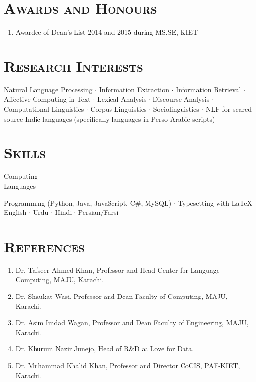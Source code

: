 \documentclass[a4paper, 10pt]{article}
\begin{document}
\section*{\normalfont\textsc{Awards and Honours}}
\begin{enumerate}
\itemsep-4pt 
 \item Awardee of Dean's List 2014 and 2015 during MS.SE, KIET
\end{enumerate}

\section*{\normalfont\textsc{Research Interests}}
Natural Language Processing $\cdot$ Information Extraction $\cdot$ Information Retrieval $\cdot$ Affective Computing in Text $\cdot$ Lexical Analysis $\cdot$ Discourse Analysis $\cdot$ Computational Linguistics $\cdot$  Corpus Linguistics $\cdot$ Sociolinguistics $\cdot$ NLP for scared source Indic languages (specifically languages in Perso-Arabic scripts)

\section*{\normalfont\textsc{Skills}}
\hfill\begin{minipage}{0.17\textwidth}
Computing\textcolor{lightgray}{\dotfill}\\
Languages\textcolor{lightgray}{\dotfill}
\end{minipage}%
\begin{minipage}{0.8\textwidth}
Programming (Python, Java, JavaScript, C\#, MySQL) $\cdot$ Typesetting with \LaTeX\\
English $\cdot$ Urdu $\cdot$ Hindi $\cdot$ Persian/Farsi %
\end{minipage}

\section*{\normalfont\textsc{References}}
\begin{enumerate}
\itemsep-4pt
 \item Dr. Tafseer Ahmed Khan, Professor and Head Center for Language Computing, MAJU, Karachi.
 \item Dr. Shaukat Wasi, Professor and Dean Faculty of Computing, MAJU, Karachi.
 \item Dr. Asim Imdad Wagan, Professor and Dean Faculty of Engineering, MAJU, Karachi.
 \item Dr. Khurum Nazir Junejo, Head of R\&D at Love for Data.
 \item Dr. Muhammad Khalid Khan, Professor and Director CoCIS, PAF-KIET, Karachi.
\end{enumerate}
\end{document}
